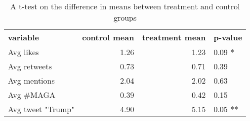 \begin{table}[ht]
\centering
\begin{tabular}{lrrl}
  \hline
variable & control mean & treatment mean & p-value \\ 
  \hline
Avg likes & 1.26 & 1.23 & 0.09 * \\ 
  Avg retweets & 0.73 & 0.71 & 0.39 \\ 
  Avg mentions & 2.04 & 2.02 & 0.63 \\ 
  Avg \#MAGA & 0.39 & 0.42 & 0.15 \\ 
  Avg tweet "Trump" & 4.90 & 5.15 & 0.05 ** \\ 
   \hline
\end{tabular}
\caption{A t-test on the difference in means between treatment and control groups} 
\label{table:diff_means}
\end{table}
